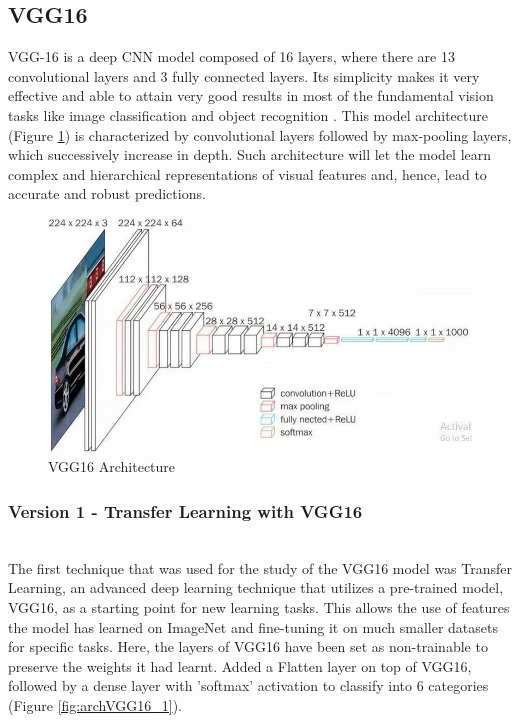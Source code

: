 \documentclass[conference]{IEEEtran}
\begin{document}
\subsection{VGG16}

VGG-16 is a deep CNN model composed of 16 layers, where there are 13 convolutional layers and 3 fully connected layers. Its simplicity makes it very effective and able to attain very good results in most of the fundamental vision tasks like image classification and object recognition \cite{web:VGG16:2024}. This model architecture (Figure \ref{fig:VGG16Arch}) is characterized by convolutional layers followed by max-pooling layers, which successively increase in depth. Such architecture will let the model learn complex and hierarchical representations of visual features and, hence, lead to accurate and robust predictions.

\begin{figure}[H]
    \centering
    \includegraphics[width=1\linewidth]{images/archVgg16.png}
    \caption{VGG16 Architecture}
    \label{fig:VGG16Arch}
\end{figure}

\subsubsection{Version 1 - Transfer Learning with VGG16}
\hfill\\

The first technique that was used for the study of the VGG16 model was Transfer Learning, an advanced deep learning technique that utilizes a pre-trained model, VGG16, as a starting point for new learning tasks. This allows the use of features the model has learned on ImageNet and fine-tuning it on much smaller datasets for specific tasks. Here, the layers of VGG16 have been set as non-trainable to preserve the weights it had learnt. Added a Flatten layer on top of VGG16, followed by a dense layer with 'softmax' activation to classify into 6 categories (Figure \ref{fig:archVGG16_1}).
\end{document}
